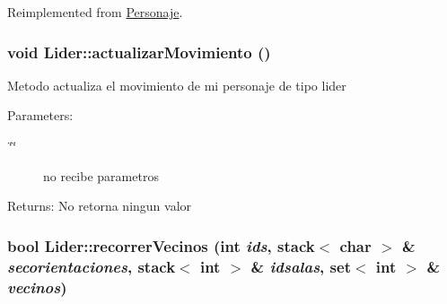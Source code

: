 Reimplemented from \hyperlink{classPersonaje_f6dc20013805229005dfb87fc6f273b5}{Personaje}.\hypertarget{classLider_87a0b4fca538efa5c9b7d01992f362e6}{
\subsubsection[actualizarMovimiento]{\setlength{\rightskip}{0pt plus 5cm}void Lider::actualizarMovimiento ()}}
\label{classLider_87a0b4fca538efa5c9b7d01992f362e6}


Metodo actualiza el movimiento de mi personaje de tipo lider \begin{Desc}
\item[Parameters:]
\begin{description}
\item[{\em \char`\"{}\char`\"{}}]no recibe parametros \end{description}
\end{Desc}
\begin{Desc}
\item[Returns:]No retorna ningun valor \end{Desc}
\hypertarget{classLider_9b40d8d989e80fbfd39a17bac209b73e}{
\subsubsection[recorrerVecinos]{\setlength{\rightskip}{0pt plus 5cm}bool Lider::recorrerVecinos (int {\em ids}, \/  stack$<$ char $>$ \& {\em secorientaciones}, \/  stack$<$ int $>$ \& {\em idsalas}, \/  set$<$ int $>$ \& {\em vecinos})}}
\label{classLider_9b40d8d989e80fbfd39a17bac209b73e}


